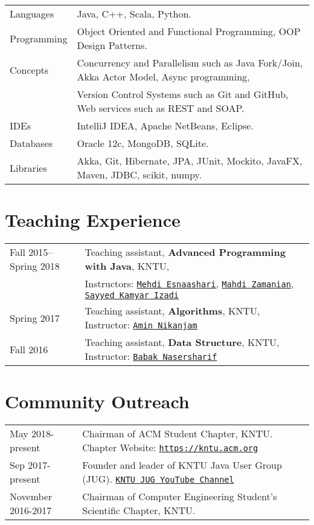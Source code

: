 \documentclass[letterpaper]{article}
\begin{document}
{{{\renewcommand{\arraystretch}{1.2}
\begin{tabular}{l l}
Languages & Java, C++, Scala, Python.
\\
Programming & Object Oriented and Functional Programming, OOP Design Patterns.
\\
Concepts & Concurrency and Parallelism such as Java Fork/Join, Akka Actor Model, Async programming, \\ & Version Control Systems such as Git and GitHub, Web services such as REST and SOAP.
\\
IDEs & IntelliJ IDEA, Apache NetBeans, Eclipse.
\\
Databases & Oracle 12c, MongoDB, SQLite.
\\
Libraries & Akka, Git, Hibernate, JPA, JUnit, Mockito, JavaFX, Maven, JDBC, scikit, numpy.
\end{tabular}


\section*{Teaching Experience}

{\renewcommand{\arraystretch}{1.2}
\begin{tabular}{l l}
Fall 2015--Spring 2018 & Teaching assistant, \textbf{Advanced Programming with Java}, KNTU, \\&Instructors: \href{https://scholar.google.com/citations?hl=en&user=kf0UQKMAAAAJ}{\tt Mehdi Esnaashari}, \href{http://wp.kntu.ac.ir/zamanian/}{\tt Mahdi Zamanian}, \href{http://wwwlgis.informatik.uni-kl.de/cms/dbis/staff/formermembers/izadi/}{\tt Sayyed Kamyar Izadi} 
\\
Spring 2017 & Teaching assistant, \textbf{Algorithms}, KNTU, Instructor: \href{https://scholar.google.com/citations?user=mGF6p48AAAAJ&hl=en}{\tt Amin Nikanjam} 
\\
Fall 2016 & Teaching assistant, \textbf{Data Structure}, KNTU, Instructor: \href{http://wp.kntu.ac.ir/bnasersharif/}{\tt Babak Nasersharif} 

\end{tabular}


\section*{Community Outreach}

{\renewcommand{\arraystretch}{1.2}
\begin{tabular}{l l}
May 2018-present & Chairman of ACM Student Chapter, KNTU. Chapter Website: \href{https://kntu.acm.org}{\tt https://kntu.acm.org} 
\\
Sep 2017-present & Founder and leader of KNTU Java User Group (JUG). \href{https://www.youtube.com/channel/UCIZWx5W3uNAKI4ggooa7qNA}{\tt KNTU JUG YouTube Channel} 
\\
November 2016-2017 & Chairman of Computer Engineering Student's Scientific Chapter, KNTU.
\end{tabular}

}}}}}
\end{document}
